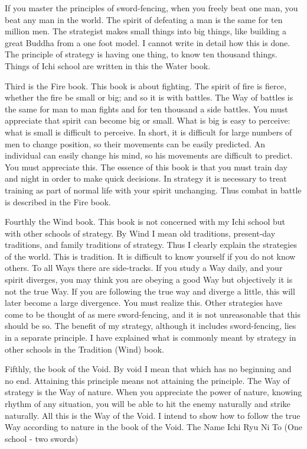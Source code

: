 If you master the principles of sword-fencing, when you freely beat one man, you beat any man in the world. The spirit of defeating a man is the same for ten million men. The strategist makes small things into big things, like building a great Buddha from a one foot model. I cannot write in detail how this is done. The principle of strategy is having one thing, to know ten thousand things. Things of Ichi school are written in this the Water book.

Third is the Fire book. This book is about fighting. The spirit of fire is fierce, whether the fire be small or big; and so it is with battles. The Way of battles is the same for man to man fights and for ten thousand a side battles. You must appreciate that spirit can become big or small. What is big is easy to perceive: what is small is difficult to perceive. In short, it is difficult for large numbers of men to change position, so their movements can be easily predicted. An individual can easily change his mind, so his movements are difficult to predict. You must appreciate this. The essence of this book is that you must train day and night in order to make quick decisions. In strategy it is necessary to treat training as part of normal life with your spirit unchanging. Thus combat in battle is described in the Fire book.

Fourthly the Wind book. This book is not concerned with my Ichi school but with other schools of strategy. By Wind I mean old traditions, present-day traditions, and family traditions of strategy. Thus I clearly explain the strategies of the world. This is tradition. It is difficult to know yourself if you do not know others. To all Ways there are side-tracks. If you study a Way daily, and your spirit diverges, you may think you are obeying a good Way but objectively it is not the true Way. If you are following the true way and diverge a little, this will later become a large divergence. You must realize this. Other strategies have come to be thought of as mere sword-fencing, and it is not unreasonable that this should be so. The benefit of my strategy, although it includes sword-fencing, lies in a separate principle. I have explained what is commonly meant by strategy in other schools in the Tradition (Wind) book.

Fifthly, the book of the Void. By void I mean that which has no beginning and no end. Attaining this principle means not attaining the principle. The Way of strategy is the Way of nature. When you appreciate the power of nature, knowing rhythm of any situation, you will be able to hit the enemy naturally and strike naturally. All this is the Way of the Void. I intend to show how to follow the true Way according to nature in the book of the Void.
The Name Ichi Ryu Ni To (One school - two swords)

